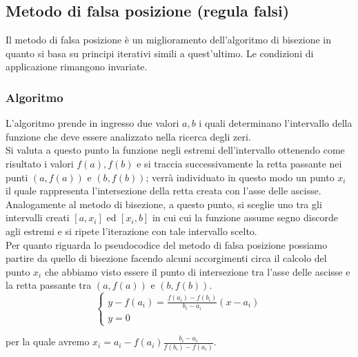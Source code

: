 \documentclass[12pt, a4paper]{book}
\theoremstyle{definition}
\begin{document}
\subsection{Metodo di falsa posizione (regula falsi) }
\begin{flushleft}

Il metodo di falsa posizione è un miglioramento dell'algoritmo di bisezione in quanto si basa su principi iterativi simili a quest'ultimo. Le condizioni di applicazione rimangono invariate.

\subsubsection{Algoritmo}
L'algoritmo prende in ingresso due valori $a,b$ i quali determinano l'intervallo della funzione che deve essere analizzato nella ricerca degli zeri.\\
Si valuta a questo punto la funzione negli estremi dell'intervallo ottenendo come risultato i valori $f(a), f(b)$ e si traccia successivamente la retta passante nei punti $(a, f(a))$ e $(b,f(b))$; verrà individuato in questo modo un punto $x_{i}$ il quale rappresenta l'intersezione della retta creata con l'asse delle ascisse.  Analogamente al metodo di bisezione,  a questo punto, si sceglie uno tra gli intervalli creati $[a, x_{i}]$ ed $[x_{i},b]$ in cui cui la funzione assume segno discorde agli estremi e si ripete l'iterazione con tale intervallo scelto.\\
\vspace{1em}
Per quanto riguarda lo pseudocodice  del metodo di falsa posizione possiamo partire da quello di bisezione facendo alcuni accorgimenti circa il calcolo del punto $x_{i}$ che abbiamo visto essere il punto di intersezione tra l'asse delle ascisse e la retta passante tra  $(a, f(a))$ e $(b,f(b))$. \\
\[
	\begin{cases}
  		y - f(a_{i}) = \frac{f(a_{i}) - f(b_{i})}{b_{i} - a_{i}} (x-a_{i})\\
 		y = 0 
	\end{cases}
\]

per la quale avremo $x_{i} = a_{i} - f(a_{i})  \frac{b_{i} - a_{i}}{f(b_{i}) - f(a_{i})}$.\\


\end{flushleft}
\end{document}
